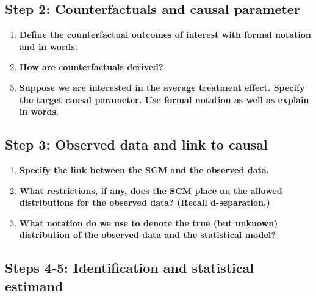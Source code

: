 \documentclass{article}\usepackage[]{graphicx}\usepackage[]{xcolor}
\begin{document}
  \subsection{Step 2: Counterfactuals and causal parameter}
  
  \begin{enumerate}[label=\textbf{\alph*.}]
  
    \item \textbf{Define the counterfactual outcomes of interest with formal notation and in words.}
    
    \item \textbf{How are counterfactuals derived?}
    
    \item \textbf{Suppose we are interested in the average treatment effect. Specify the target causal parameter. Use formal notation as well as explain in words.}
 
  \end{enumerate}
  
  \subsection{Step 3: Observed data and link to causal}
  
  \begin{enumerate}[label=\textbf{\alph*.}]
  
    \item \textbf{Specify the link between the SCM and the observed data.}
    
    \item \textbf{What restrictions, if any, does the SCM place on the allowed distributions for the observed data? (Recall d-separation.)}
    
    \item \textbf{What notation do we use to denote the true (but unknown) distribution of the observed data and the statistical model?}
  
  \end{enumerate}
  
  \subsection{Steps 4-5: Identification and statistical estimand}
  
\end{document}
